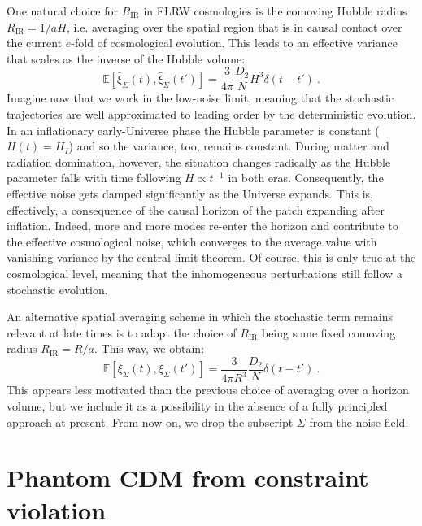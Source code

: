 \documentclass[amsmath,amssymb,11pt]{article}
\begin{document}
One natural choice for $R_\text{IR}$ in FLRW cosmologies is the comoving Hubble radius $R_\text{IR} = 1/aH$, i.e. averaging over the spatial region that is in causal contact over the current $e$-fold of cosmological evolution. This leads to an effective variance that scales as the inverse of the Hubble volume:
\begin{equation}
    \label{eq:noise_hub}
     \mathbb{E}[\bar{\xi}_\Sigma(t),\bar{\xi}_\Sigma(t')] = \frac{3}{4\pi}\frac{D_2}{N} H^3 \delta(t-t') \ .
\end{equation}
Imagine now that we work in the low-noise limit, meaning that the stochastic trajectories are well approximated to leading order by the deterministic evolution. In an inflationary early-Universe phase the Hubble parameter is constant ($H(t)=H_I$) and so the variance, too, remains constant. During matter and radiation domination, however, the situation changes radically as the Hubble parameter falls with time following $H\propto t^{-1}$ in both eras. Consequently, the effective noise gets damped significantly as the Universe expands. This is, effectively, a consequence of the causal horizon of the patch expanding after inflation. Indeed, more and more modes re-enter the horizon and contribute to the effective cosmological noise, which converges to the average value with vanishing variance by the central limit theorem. Of course, this is only true at the cosmological level, meaning that the inhomogeneous perturbations still follow a stochastic evolution.

An alternative spatial averaging scheme in which the stochastic term remains relevant at late times is to adopt the choice of $R_{\text{IR}}$ being some fixed comoving radius $R_{\text{IR}} = R/a$. This way, we obtain:
\begin{equation}
     \mathbb{E}[\bar{\xi}_\Sigma(t),\bar{\xi}_\Sigma(t')] = \frac{3}{4\pi R^3}\frac{D_2}{N} \delta(t-t') \ .
\end{equation}
This appears less motivated than the previous choice of averaging over a horizon volume, but we include it as a possibility in the absence of a fully principled approach at present. From now on, we drop the subscript $\Sigma$ from the noise field.

\section{Phantom CDM from constraint violation}
\label{sec:constraint}
\end{document}
